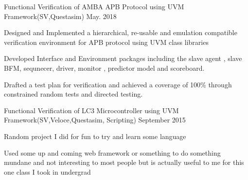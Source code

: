 \begin{cvprojects}
  \cvproject
    {Functional Verification of AMBA APB Protocol using UVM Framework(SV,Questasim)} 
    {\color{darkgray}May. 2018}
    {
      \begin{cvprojectitems}
        \item {Designed and Implemented a hierarchical, re-usable and emulation compatible verification environment for APB protocol using UVM class libraries}
        \item {Developed Interface and Environment packages including the slave agent , slave BFM, sequnecer, driver, monitor , predictor model and scoreboard.}
        \item {Drafted a test plan for verification and achieved a coverage of 100\% through constrained random tests and directed testing. }
      \end{cvprojectitems}
    }
  \cvproject
    {Functional Verification of LC3 Microcontroller using UVM Framework(SV,Veloce,Questasim, Scripting)}
    {September 2015}
    {
      \begin{cvprojectitems}
        \item {Random project I did for fun to try and learn some language}
        \item {Used some up and coming web framework or something to do something mundane and not interesting to most people but is actually useful to me for this one class I took in undergrad}
      \end{cvprojectitems}
    }
\end{cvprojects}